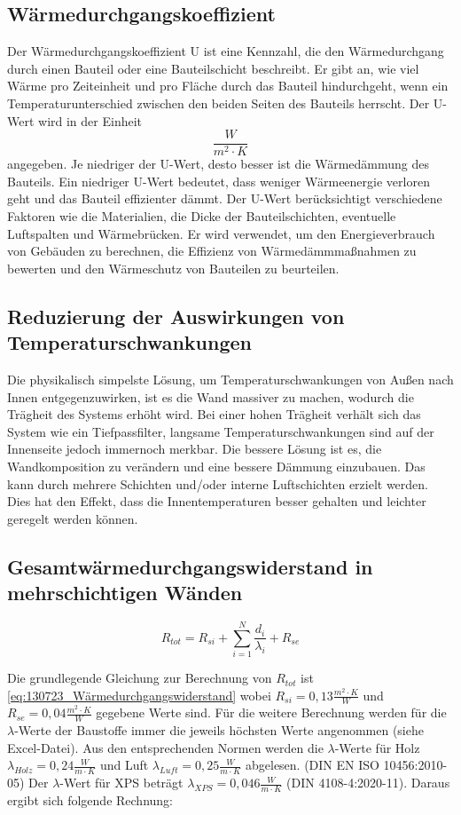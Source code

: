 \subsection{Wärmedurchgangskoeffizient}
Der Wärmedurchgangskoeffizient U ist eine Kennzahl, die den Wärmedurchgang durch einen Bauteil oder eine Bauteilschicht beschreibt. 
Er gibt an, wie viel Wärme pro Zeiteinheit und pro Fläche durch das Bauteil hindurchgeht, wenn ein Temperaturunterschied zwischen den beiden Seiten des Bauteils herrscht.
Der U-Wert wird in der Einheit $$\frac{W}{m^2 \cdot K}$$ angegeben. Je niedriger der U-Wert, desto besser ist die Wärmedämmung des Bauteils. 
Ein niedriger U-Wert bedeutet, dass weniger Wärmeenergie verloren geht und das Bauteil effizienter dämmt.
Der U-Wert berücksichtigt verschiedene Faktoren wie die Materialien, die Dicke der Bauteilschichten, eventuelle Luftspalten und Wärmebrücken. 
Er wird verwendet, um den Energieverbrauch von Gebäuden zu berechnen, die Effizienz von Wärmedämmmaßnahmen zu bewerten und den Wärmeschutz von Bauteilen zu beurteilen.

\subsection{Reduzierung der Auswirkungen von Temperaturschwankungen}

Die physikalisch simpelste Lösung, um Temperaturschwankungen von Außen nach Innen entgegenzuwirken, ist es die Wand massiver zu machen, wodurch die Trägheit des Systems erhöht wird.
Bei einer hohen Trägheit verhält sich das System wie ein Tiefpassfilter, langsame Temperaturschwankungen sind auf der Innenseite jedoch immernoch merkbar.
Die bessere Lösung ist es, die Wandkomposition zu verändern und eine bessere Dämmung einzubauen.
Das kann durch mehrere Schichten und/oder interne Luftschichten erzielt werden.
Dies hat den Effekt, dass die Innentemperaturen besser gehalten und leichter geregelt werden können.

\subsection{Gesamtwärmedurchgangswiderstand in mehrschichtigen Wänden}
\begin{equation}
	\label{eq:130723_Wärmedurchgangswiderstand}
	R_{tot}=R_{si}+\sum_{i=1}^N \frac{d_i}{\lambda_i}+R_{se}
\end{equation}

Die grundlegende Gleichung zur Berechnung von $R_{tot}$ ist \autoref{eq:130723_Wärmedurchgangswiderstand} wobei $R_{si}=0,13\frac{m^2 \cdot K}{W}$ und $R_{se}=0,04\frac{m^2 \cdot K}{W}$  gegebene Werte sind.
Für die weitere Berechnung werden für die $\lambda$-Werte der Baustoffe immer die jeweils höchsten Werte angenommen (siehe Excel-Datei). Aus den entsprechenden Normen werden
die $\lambda$-Werte für Holz \cite[S.20]{lamda-holz-luft} $\lambda_{Holz}=0,24\frac{W}{m\cdot K}$ und Luft\cite[S. 15]{lamda-holz-luft} $\lambda_{Luft}=0,25\frac{W}{m\cdot K}$ abgelesen. (DIN EN ISO 10456:2010-05)
Der $\lambda$-Wert für XPS \cite[S.23]{lamda-xps} beträgt $\lambda_{XPS}=0,046\frac{W}{m\cdot K}$ (DIN 4108-4:2020-11). Daraus ergibt sich folgende Rechnung:

